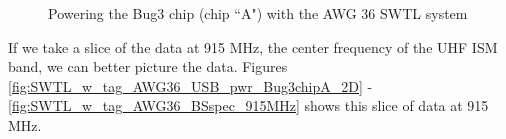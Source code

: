 \documentclass[12pt,onecolumn,titlepage]{article}
\begin{document}
\begin{figure}[htbp]
	\centering
		\quad
		
	\label{fig:SWTL_w_tag_AWG36}
	\caption{Powering the Bug3 chip (chip ``A") with the AWG 36 SWTL system }
\end{figure}



If we take a slice of the data at 915 MHz, the center frequency of the UHF ISM band, we can better picture the data. Figures \ref{fig:SWTL_w_tag_AWG36_USB_pwr_Bug3chipA_2D} - \ref{fig:SWTL_w_tag_AWG36_BSspec_915MHz} shows this slice of data at 915 MHz. 
\end{document}

